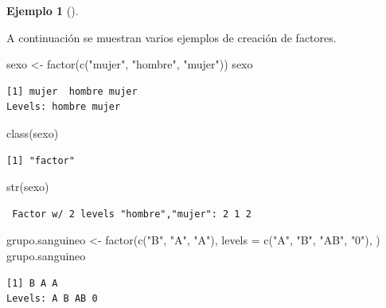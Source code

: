 \documentclass[
  a4paper,
]{scrreport}
\newenvironment{Shaded}{\begin{snugshade}}{\end{snugshade}}
\newcommand{\AttributeTok}[1]{\textcolor[rgb]{0.40,0.45,0.13}{#1}}
\newcommand{\FunctionTok}[1]{\textcolor[rgb]{0.28,0.35,0.67}{#1}}
\newcommand{\NormalTok}[1]{\textcolor[rgb]{0.00,0.23,0.31}{#1}}
\newcommand{\OtherTok}[1]{\textcolor[rgb]{0.00,0.23,0.31}{#1}}
\newcommand{\StringTok}[1]{\textcolor[rgb]{0.13,0.47,0.30}{#1}}
\theoremstyle{definition}
\newtheorem{example}{Ejemplo}[chapter]
\theoremstyle{definition}
\theoremstyle{remark}
\begin{document}
\leavevmode{}%
\begin{example}[]\label{exm-creacion-factores}

A continuación se muestran varios ejemplos de creación de factores.

\begin{Shaded}
\begin{Highlighting}[]
\NormalTok{sexo }\OtherTok{\textless{}{-}} \FunctionTok{factor}\NormalTok{(}\FunctionTok{c}\NormalTok{(}\StringTok{"mujer"}\NormalTok{, }\StringTok{"hombre"}\NormalTok{, }\StringTok{"mujer"}\NormalTok{))}
\NormalTok{sexo}
\end{Highlighting}
\end{Shaded}

\begin{verbatim}
[1] mujer  hombre mujer 
Levels: hombre mujer
\end{verbatim}

\begin{Shaded}
\begin{Highlighting}[]
\FunctionTok{class}\NormalTok{(sexo)}
\end{Highlighting}
\end{Shaded}

\begin{verbatim}
[1] "factor"
\end{verbatim}

\begin{Shaded}
\begin{Highlighting}[]
\FunctionTok{str}\NormalTok{(sexo)}
\end{Highlighting}
\end{Shaded}

\begin{verbatim}
 Factor w/ 2 levels "hombre","mujer": 2 1 2
\end{verbatim}

\begin{Shaded}
\begin{Highlighting}[]
\NormalTok{grupo.sanguineo }\OtherTok{\textless{}{-}} \FunctionTok{factor}\NormalTok{(}\FunctionTok{c}\NormalTok{(}\StringTok{"B"}\NormalTok{, }\StringTok{"A"}\NormalTok{, }\StringTok{"A"}\NormalTok{), }\AttributeTok{levels =} \FunctionTok{c}\NormalTok{(}\StringTok{"A"}\NormalTok{, }\StringTok{"B"}\NormalTok{, }\StringTok{"AB"}\NormalTok{, }\StringTok{"0"}\NormalTok{), )}
\NormalTok{grupo.sanguineo}
\end{Highlighting}
\end{Shaded}

\begin{verbatim}
[1] B A A
Levels: A B AB 0
\end{verbatim}

\end{example}
\end{document}
